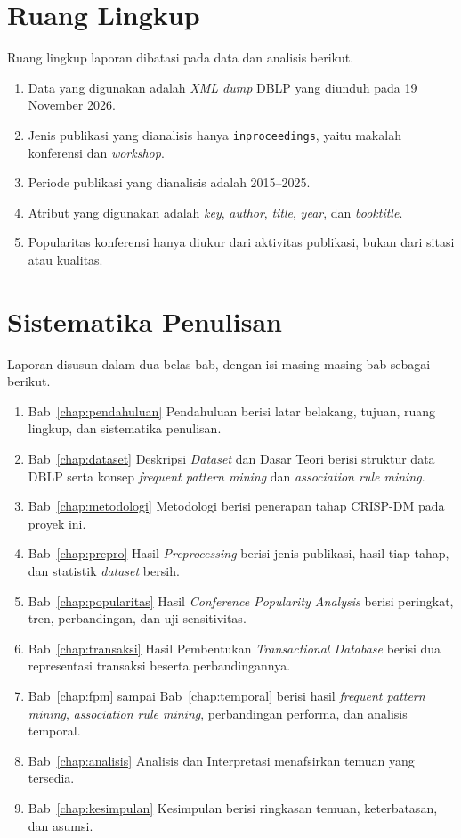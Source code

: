 \section{Ruang Lingkup}
Ruang lingkup laporan dibatasi pada data dan analisis berikut.
\begin{enumerate}
\item Data yang digunakan adalah \textit{XML dump} DBLP \cite{dblpxml} yang diunduh pada 19 November 2026.
\item Jenis publikasi yang dianalisis hanya \texttt{inproceedings}, yaitu makalah konferensi dan \textit{workshop}.
\item Periode publikasi yang dianalisis adalah 2015--2025.
\item Atribut yang digunakan adalah \textit{key}, \textit{author}, \textit{title}, \textit{year}, dan \textit{booktitle}.
\item Popularitas konferensi hanya diukur dari aktivitas publikasi, bukan dari sitasi atau kualitas.
\end{enumerate}

\section{Sistematika Penulisan}
Laporan disusun dalam dua belas bab, dengan isi masing-masing bab sebagai berikut.
\begin{enumerate}
\item Bab~\ref{chap:pendahuluan} Pendahuluan berisi latar belakang, tujuan, ruang lingkup, dan sistematika penulisan.
\item Bab~\ref{chap:dataset} Deskripsi \textit{Dataset} dan Dasar Teori berisi struktur data DBLP serta konsep \textit{frequent pattern mining} dan \textit{association rule mining}.
\item Bab~\ref{chap:metodologi} Metodologi berisi penerapan tahap CRISP-DM pada proyek ini.
\item Bab~\ref{chap:prepro} Hasil \textit{Preprocessing} berisi jenis publikasi, hasil tiap tahap, dan statistik \textit{dataset} bersih.
\item Bab~\ref{chap:popularitas} Hasil \textit{Conference Popularity Analysis} berisi peringkat, tren, perbandingan, dan uji sensitivitas.
\item Bab~\ref{chap:transaksi} Hasil Pembentukan \textit{Transactional Database} berisi dua representasi transaksi beserta perbandingannya.
\item Bab~\ref{chap:fpm} sampai Bab~\ref{chap:temporal} berisi hasil \textit{frequent pattern mining}, \textit{association rule mining}, perbandingan performa, dan analisis temporal.
\item Bab~\ref{chap:analisis} Analisis dan Interpretasi menafsirkan temuan yang tersedia.
\item Bab~\ref{chap:kesimpulan} Kesimpulan berisi ringkasan temuan, keterbatasan, dan asumsi.
\end{enumerate}
